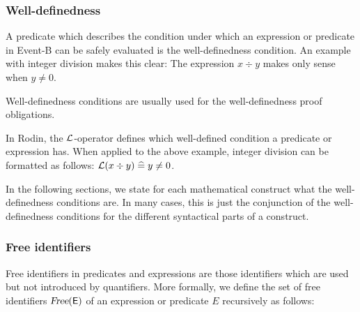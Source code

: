 \subsubsection{Well-definedness}
\label{well_definedness}

A predicate which describes the condition under which an expression or predicate in Event-B can be safely evaluated is the well-definedness condition.
An example with integer division makes this clear: The expression $x\div y$ makes only sense when $y\neq 0$.

Well-definedness conditions are usually used for the well-definedness proof obligations.

In Rodin, the $\mathcal{L}$-operator defines which well-defined condition a predicate or expression has.
When applied to the above example, integer division can be formatted as follows: $\mathcal{L}(x\div y) \mathrel{\widehat=} y\neq 0$.

In the following sections, we state for each mathematical construct what the well-definedness conditions are.
In many cases, this is just the conjunction of the well-definedness conditions for the different syntactical parts of a construct.


\subsubsection{Free identifiers}
\label{free_identifiers}
Free identifiers in predicates and expressions are those identifiers which are used but not introduced by quantifiers.
More formally, we define the set of free identifiers $\textsl{Free}(\textsf{E})$ of an expression or predicate $E$ recursively as follows:

